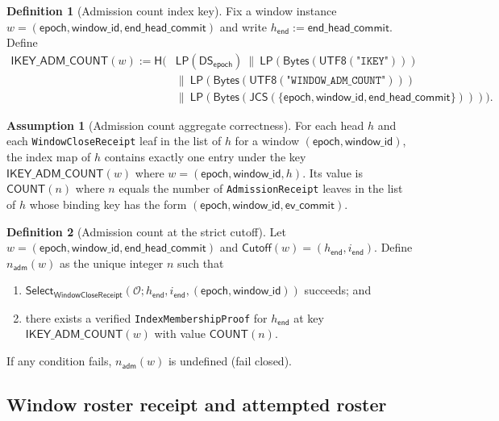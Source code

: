 \documentclass[11pt]{article}
\newcommand{\code}[1]{\texttt{#1}}
\newcommand{\1}{\mathbf{1}}
\newcommand{\Hash}{\mathsf{H}}
\newcommand{\DS}{\mathsf{DS}}
\newcommand{\LP}{\mathsf{LP}}
\theoremstyle{definition}
\newtheorem{definition}{Definition}
\newtheorem{assumption}{Assumption}
\theoremstyle{plain}
\begin{document}
\begin{definition}[Admission count index key]
\label{def:adm_count_key}
Fix a window instance $w=(\textsf{epoch},\textsf{window\_id},\textsf{end\_head\_commit})$ and write $h_{\textsf{end}}:=\textsf{end\_head\_commit}$.
Define
\begin{align*}
\textsf{IKEY\_ADM\_COUNT}(w) := \Hash\!\big(
  &\LP(\DS_{\textsf{epoch}})\ \|\ \LP(\mathsf{Bytes}(\textsf{UTF8}(\texttt{"IKEY"})))\\
  &\|\ \LP(\mathsf{Bytes}(\textsf{UTF8}(\texttt{"WINDOW\_ADM\_COUNT"})))\\
  &\|\ \LP(\mathsf{Bytes}(\textsf{JCS}(\{\textsf{epoch},\textsf{window\_id},\textsf{end\_head\_commit}\})))
\big).
\end{align*}
\end{definition}

\begin{assumption}[Admission count aggregate correctness]
\label{ass:adm_count_correct}
For each head $h$ and each \code{WindowCloseReceipt} leaf in the list of $h$ for a window $(\textsf{epoch},\textsf{window\_id})$, the index map of $h$ contains exactly one entry under the key $\textsf{IKEY\_ADM\_COUNT}(w)$ where $w=(\textsf{epoch},\textsf{window\_id},h)$.
Its value is $\textsf{COUNT}(n)$ where $n$ equals the number of \code{AdmissionReceipt} leaves in the list of $h$ whose binding key has the form $(\textsf{epoch},\textsf{window\_id},\textsf{ev\_commit})$.
\end{assumption}

\begin{definition}[Admission count at the strict cutoff]
\label{def:adm_count_at_cutoff}
Let $w=(\textsf{epoch},\textsf{window\_id},\textsf{end\_head\_commit})$ and $\textsf{Cutoff}(w)=(h_{\textsf{end}},i_{\textsf{end}})$.
Define $n_{\textsf{adm}}(w)$ as the unique integer $n$ such that
\begin{enumerate}[leftmargin=*]
\item $\mathsf{Select}_{\textsf{WindowCloseReceipt}}(\mathcal{O};h_{\textsf{end}},i_{\textsf{end}},(\textsf{epoch},\textsf{window\_id}))$ succeeds; and
\item there exists a verified \code{IndexMembershipProof} for $h_{\textsf{end}}$ at key $\textsf{IKEY\_ADM\_COUNT}(w)$ with value $\textsf{COUNT}(n)$.
\end{enumerate}
If any condition fails, $n_{\textsf{adm}}(w)$ is undefined (fail closed).
\end{definition}

\subsection{Window roster receipt and attempted roster}
\label{sec:roster}
\end{document}
